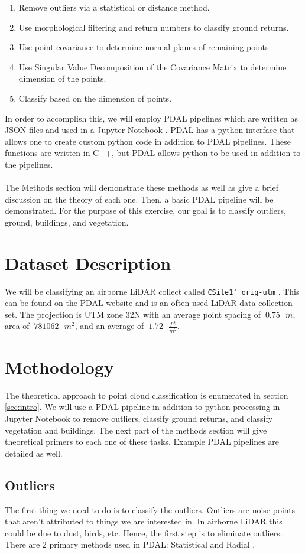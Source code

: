 \documentclass[11pt]{article}
\theoremstyle{definition}
\begin{document}
	\begin{enumerate}  
	\item Remove outliers via a statistical or distance method.
	\item Use morphological filtering and return numbers to classify ground returns.
	\item Use point covariance to determine normal planes of remaining points.
	\item Use Singular Value Decomposition of the Covariance Matrix to determine dimension of the points.
	\item Classify based on the dimension of points.
\end{enumerate}
In order to accomplish this, we will employ PDAL pipelines which are written as JSON files and used in a Jupyter Notebook  \cite{pdal}.  PDAL has a python interface that allows one to create custom python code in addition to PDAL pipelines.  These functions are written in C++, but PDAL allows python to be used in addition to the pipelines.
\\\\
The Methods section will demonstrate these methods as well as give a brief discussion on the theory of each one.  Then, a basic PDAL pipeline will be demonstrated.  For the purpose of this exercise, our goal is to classify outliers, ground, buildings, and vegetation. 
\section{Dataset Description}\label{sec:dataset}
We will be classifying an airborne LiDAR collect called \texttt{CSite1\char`_orig-utm} \cite{pdal}. This can be found on the PDAL website and is an often used LiDAR data collection set. The projection is UTM zone 32N with an average point spacing of $~0.75\text{ }m$, area of $~781062\text{ }m^2$, and an average of $~1.72\text{ }\frac{pt}{m^2}$.

\section{Methodology}\label{methods}
The theoretical approach to point cloud classification is enumerated in section \ref{sec:intro}.  We will use a PDAL pipeline in addition to python processing in Jupyter Notebook to remove outliers, classify ground returns, and classify vegetation and buildings.  The next part of the methods section will give theoretical primers to each one of these tasks.  Example PDAL pipelines are detailed as well.  
\subsection{Outliers}\label{sub:outliers}
The first thing we need to do is to classify the outliers.  Outliers are noise points that aren't attributed to things we are interested in.  In airborne LiDAR this could be due to dust, birds, etc.  Hence, the first step is to eliminate outliers.  There are 2 primary methods used in PDAL: Statistical and Radial \cite{pdal}.
\end{document}

